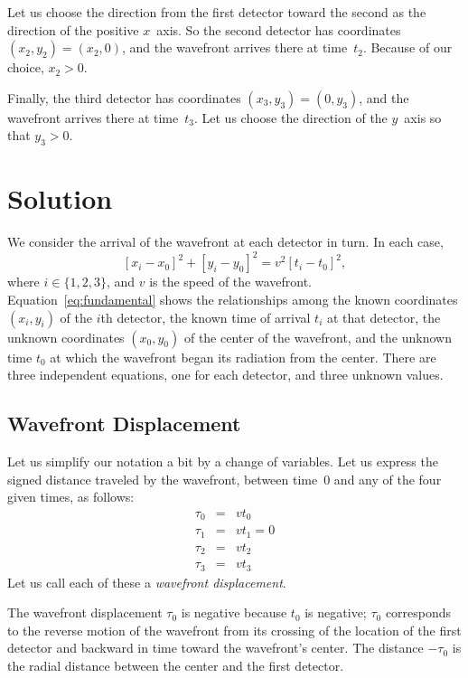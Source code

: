 \documentclass[twocolumn]{article}
\begin{document}
Let us choose the direction from the first detector toward the second
as the direction of the positive $x$~axis.  So the second detector has
coordinates $(x_2, y_2) = (x_2, 0)$, and the wavefront arrives there at
time~$t_2$.  Because of our choice, $x_2 > 0$.

Finally, the third detector has coordinates $(x_3, y_3) = (0, y_3)$, and the
wavefront arrives there at time~$t_3$.  Let us choose the direction of the
$y$~axis so that $y_3 > 0$.

\section{Solution}

We consider the arrival of the wavefront at each detector in turn.  In each
case,
\begin{equation}
   \left[x_i - x_0\right]^2 + \left[y_i - y_0\right]^2 = v^2 \left[t_i -
   t_0\right]^2,
   \label{eq:fundamental}
\end{equation}
where $i \in \{1, 2, 3\}$, and $v$ is the speed of the wavefront.
Equation~\ref{eq:fundamental} shows the relationships among the known
coordinates $(x_i, y_i)$ of the $i$th detector, the known time of arrival $t_i$
at that detector, the unknown coordinates $(x_0, y_0)$ of the center of the
wavefront, and the unknown time $t_0$ at which the wavefront began its
radiation from the center.  There are three independent equations, one for each
detector, and three unknown values.

\subsection{Wavefront Displacement}

Let us simplify our notation a bit by a change of variables.  Let us express
the signed distance traveled by the wavefront, between time~0 and any of the
four given times, as follows:
\begin{eqnarray}
   \tau_0 &=& vt_0\\
   \tau_1 &=& vt_1 = 0\\
   \tau_2 &=& vt_2\\
   \tau_3 &=& vt_3
\end{eqnarray}
Let us call each of these a \emph{wavefront displacement}.

The wavefront displacement $\tau_0$ is negative because $t_0$ is negative;
$\tau_0$ corresponds to the reverse motion of the wavefront from its crossing
of the location of the first detector and backward in time toward the
wavefront's center.  The distance $-\tau_0$ is the radial distance between the
center and the first detector.
\end{document}
